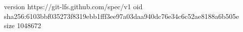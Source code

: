 version https://git-lfs.github.com/spec/v1
oid sha256:6103bbf035273f8319ebb1fff3ee97a03daa940dc76e34c6c52ae8188a6b505e
size 1048672
